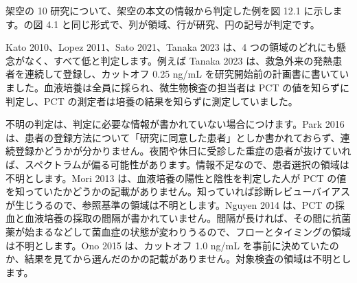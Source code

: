 架空の 10 研究について、架空の本文の情報から判定した例を図 12.1 に示します。の図 4.1 と同じ形式で、列が領域、行が研究、円の記号が判定です。

\begin{kkcenter}
\begin{minipage}{\linewidth}\centering
\begin{kkfitpic}
\end{kkfitpic}
\end{minipage}
\end{kkcenter}

Kato 2010、Lopez 2011、Sato 2021、Tanaka 2023 は、4 つの領域のどれにも懸念がなく、すべて低と判定します。例えば Tanaka 2023 は、救急外来の発熱患者を連続して登録し、カットオフ 0.25 ng/mL を研究開始前の計画書に書いていました。血液培養は全員に採られ、微生物検査の担当者は PCT の値を知らずに判定し、PCT の測定者は培養の結果を知らずに測定していました。

不明の判定は、判定に必要な情報が書かれていない場合につけます。Park 2016 は、患者の登録方法について「研究に同意した患者」としか書かれておらず、連続登録かどうかが分かりません。夜間や休日に受診した重症の患者が抜けていれば、スペクトラムが偏る可能性があります。情報不足なので、患者選択の領域は不明とします。Mori 2013 は、血液培養の陽性と陰性を判定した人が PCT の値を知っていたかどうかの記載がありません。知っていれば診断レビューバイアスが生じうるので、参照基準の領域は不明とします。Nguyen 2014 は、PCT の採血と血液培養の採取の間隔が書かれていません。間隔が長ければ、その間に抗菌薬が始まるなどして菌血症の状態が変わりうるので、フローとタイミングの領域は不明とします。Ono 2015 は、カットオフ 1.0 ng/mL を事前に決めていたのか、結果を見てから選んだのかの記載がありません。対象検査の領域は不明とします。

